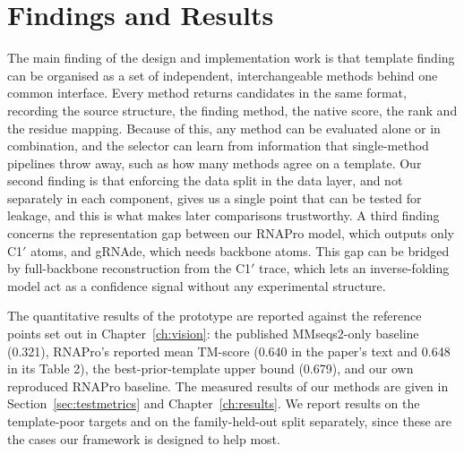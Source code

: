 \documentclass{FastFyp}
\begin{document}
\section{Findings and Results}
The main finding of the design and implementation work is that template finding can be organised as a set of independent, interchangeable methods behind one common interface. Every method returns candidates in the same format, recording the source structure, the finding method, the native score, the rank and the residue mapping. Because of this, any method can be evaluated alone or in combination, and the selector can learn from information that single-method pipelines throw away, such as how many methods agree on a template. Our second finding is that enforcing the data split in the data layer, and not separately in each component, gives us a single point that can be tested for leakage, and this is what makes later comparisons trustworthy. A third finding concerns the representation gap between our RNAPro model, which outputs only C1$'$ atoms, and gRNAde, which needs backbone atoms. This gap can be bridged by full-backbone reconstruction from the C1$'$ trace, which lets an inverse-folding model act as a confidence signal without any experimental structure.

The quantitative results of the prototype are reported against the reference points set out in Chapter~\ref{ch:vision}: the published MMseqs2-only baseline (0.321), RNAPro's reported mean TM-score (0.640 in the paper's text and 0.648 in its Table 2), the best-prior-template upper bound (0.679), and our own reproduced RNAPro baseline. The measured results of our methods are given in Section~\ref{sec:testmetrics} and Chapter~\ref{ch:results}. We report results on the template-poor targets and on the family-held-out split separately, since these are the cases our framework is designed to help most.
\end{document}
